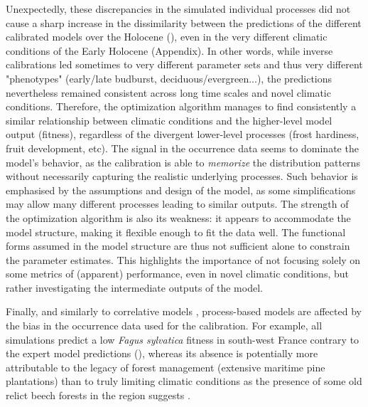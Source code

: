 \documentclass[letterpaper,8pt]{extarticle}  %
\begin{document}
\begin{doublespacing}
\begin{linenumbers}
Unexpectedly, these discrepancies in the simulated individual processes did not cause a sharp increase in the dissimilarity between the predictions of the different calibrated models over the Holocene (), even in the very different climatic conditions of the Early Holocene (Appendix). In other words, while inverse calibrations led sometimes to very different parameter sets and thus very different "phenotypes" (early/late budburst, deciduous/evergreen...), the predictions nevertheless remained consistent across long time scales and novel climatic conditions. Therefore, the optimization algorithm manages to find consistently a similar relationship between climatic conditions and the higher-level model output (fitness), regardless of the divergent lower-level processes (frost hardiness, fruit development, etc). The signal in the occurrence data seems to dominate the model's behavior, as the calibration is able to \emph{memorize} the distribution patterns without necessarily capturing the realistic underlying processes. Such behavior is emphasised by the assumptions and design of the model, as some simplifications may allow many different processes leading to similar outputs. The strength of the optimization algorithm is also its weakness: it appears to accommodate the model structure, making it flexible enough to fit the data well. The functional forms assumed in the model structure are thus not sufficient alone to constrain the parameter estimates. This highlights the importance of not focusing solely on some metrics of (apparent) performance, even in novel climatic conditions, but rather investigating the intermediate outputs of the model.

Finally, and similarly to correlative models \citep{BarbetMassin2010, Duputie2014},  process-based models are affected by the bias in the occurrence data used for the calibration. For example, all simulations predict a low \emph{Fagus sylvatica} fitness in south-west France contrary to the expert model predictions (), whereas its absence is potentially more attributable to the legacy of forest management (extensive maritime pine plantations) than to truly limiting climatic conditions as the presence of some old relict beech forests in the region suggests \citep{Lafontaine2014}.



\end{linenumbers}
\end{doublespacing}
\end{document}
